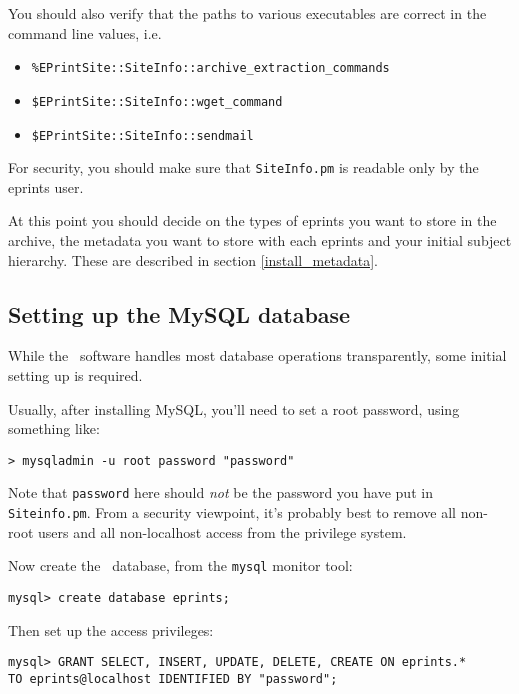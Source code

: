 You should also verify that the paths to various executables are correct in the command line values, i.e.

\begin{itemize}
\item {\tt \%EPrintSite::SiteInfo::archive\_extraction\_commands}
\item {\tt \$EPrintSite::SiteInfo::wget\_command}
\item {\tt \$EPrintSite::SiteInfo::sendmail}
\end{itemize}

For security, you should make sure that {\tt SiteInfo.pm} is readable only by the eprints user.

At this point you should decide on the types of eprints you want to store in the archive, the metadata you want to store with each eprints and your initial subject hierarchy. These are described in section \ref{install_metadata}.


\subsection{Setting up the MySQL database}

While the \eprints\ software handles most database operations transparently, some initial setting up is required.

Usually, after installing MySQL, you'll need to set a root password, using something like:

\begin{verbatim}
> mysqladmin -u root password "password"
\end{verbatim}

Note that {\tt password} here should \emph{not} be the password you have put in {\tt Siteinfo.pm}. From a security viewpoint, it's probably best to remove all non-root users and all non-localhost access from the privilege system.

Now create the \eprints\ database, from the {\tt mysql} monitor tool:

\begin{verbatim}
mysql> create database eprints;
\end{verbatim}

Then set up the access privileges:

\begin{verbatim}
mysql> GRANT SELECT, INSERT, UPDATE, DELETE, CREATE ON eprints.*
TO eprints@localhost IDENTIFIED BY "password";
\end{verbatim}

